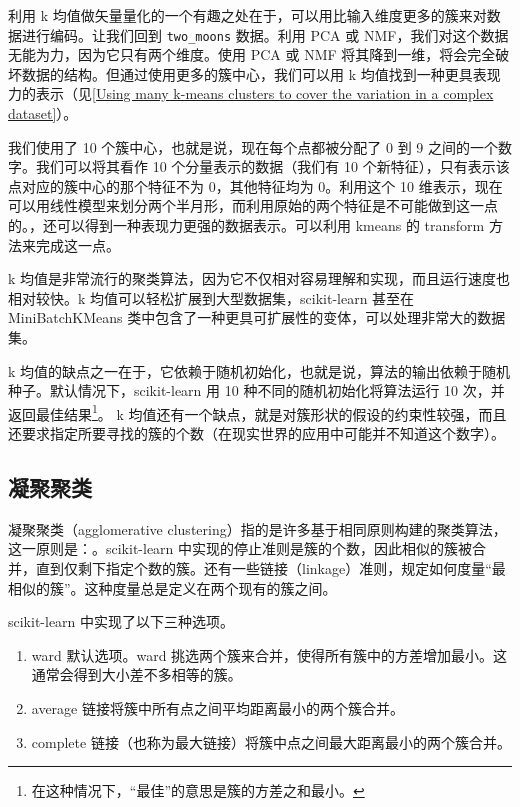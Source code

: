 利用 k 均值做矢量量化的一个有趣之处在于，可以用比输入维度更多的簇来对数据进行编码。让我们回到 \verb|two_moons| 数据。利用 PCA 或 NMF，我们对这个数据无能为力，因为它只有两个维度。使用 PCA 或 NMF 将其降到一维，将会完全破坏数据的结构。但通过使用更多的簇中心，我们可以用 k 均值找到一种更具表现力的表示（见\autoref{Using many k-means clusters to cover the variation in a complex dataset}）。


我们使用了 10 个簇中心，也就是说，现在每个点都被分配了 0 到 9 之间的一个数字。我们可以将其看作 10 个分量表示的数据（我们有 10 个新特征），只有表示该点对应的簇中心的那个特征不为 0，其他特征均为 0。利用这个 10 维表示，现在可以用线性模型来划分两个半月形，而利用原始的两个特征是不可能做到这一点的。，还可以得到一种表现力更强的数据表示。可以利用 kmeans 的 transform 方法来完成这一点。

k 均值是非常流行的聚类算法，因为它不仅相对容易理解和实现，而且运行速度也相对较快。k 均值可以轻松扩展到大型数据集，scikit-learn 甚至在 MiniBatchKMeans 类中包含了一种更具可扩展性的变体，可以处理非常大的数据集。

k 均值的缺点之一在于，它依赖于随机初始化，也就是说，算法的输出依赖于随机种子。默认情况下，scikit-learn 用 10 种不同的随机初始化将算法运行 10 次，并返回最佳结果\footnote{在这种情况下，“最佳”的意思是簇的方差之和最小。}。 k 均值还有一个缺点，就是对簇形状的假设的约束性较强，而且还要求指定所要寻找的簇的个数（在现实世界的应用中可能并不知道这个数字）。
\subsection{凝聚聚类}
凝聚聚类（agglomerative clustering）指的是许多基于相同原则构建的聚类算法，这一原则是：。scikit-learn 中实现的停止准则是簇的个数，因此相似的簇被合并，直到仅剩下指定个数的簇。还有一些链接（linkage）准则，规定如何度量“最相似的簇”。这种度量总是定义在两个现有的簇之间。


scikit-learn 中实现了以下三种选项。
\begin{enumerate}
    \item ward 默认选项。ward 挑选两个簇来合并，使得所有簇中的方差增加最小。这通常会得到大小差不多相等的簇。
    \item average 链接将簇中所有点之间平均距离最小的两个簇合并。
    \item complete 链接（也称为最大链接）将簇中点之间最大距离最小的两个簇合并。
\end{enumerate}

